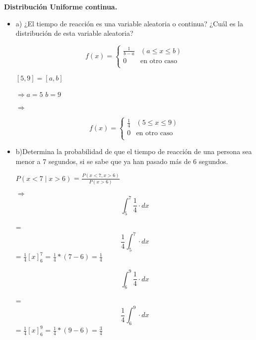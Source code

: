 \documentclass{oxmathproblems}
\begin{document}
\begin{questions}

\miquestion \textbf {Distribución Uniforme continua.} 
\begin{itemize}
\item  a) ¿El tiempo de reacción es una variable aleatoria o continua? ¿Cuál es la distribución de esta variable aleatoria?


$$$$ 
\[   
f(x) = 
     \begin{cases}
        \frac{1}{b-a} & (a \leq x \leq b)\\
       0 & \text{en otro caso} \\
     \end{cases}
\]
$$$$


$[5,9] = [a,b]$

$\Rightarrow a = 5$  $b = 9$

$\Rightarrow$ 

$$$$ 
\[   
f(x) = 
     \begin{cases}
        \frac{1}{4} & (5 \leq x \leq 9)\\
       0 & \text{en otro caso} \\
     \end{cases}
\]
$$$$


\item  b)Determina la probabilidad de que el tiempo de reacción de una persona sea menor a 7 segundos, si se sabe que ya han pasado más de 6 segundos. 

$ P(x < 7 \mid x > 6) $ 
= 
$ \frac{P(x<7,x>6)}{P(x>6)}$

$\Rightarrow$  
\begin{equation}
 \int _{5}^{7}  \frac{1}{4}  \cdot dx
\end{equation} 

= 
\begin{equation}
 \frac{1}{4} \int _{5}^{7} \cdot dx
\end{equation} 
= 
$ \frac{1}{4}[x]_6^7$  = $\frac{1}{4}*(7-6) = \frac{1}{4} $ 

\begin{equation}
 \int _{6}^{9}  \frac{1}{4}  \cdot dx
\end{equation} 

= 
\begin{equation}
 \frac{1}{4} \int _{6}^{9} \cdot dx
\end{equation} 
= 
$ \frac{1}{4}[x]_6^9$  = $\frac{1}{4}*(9-6) = \frac{3}{4} $ 


\end{itemize}
\end{questions}
\end{document}
